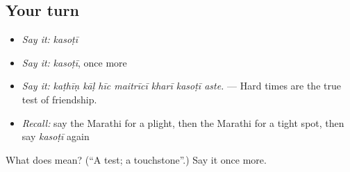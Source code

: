 \subsection*{Your turn}
\begin{itemize}
\raggedright
  \item \emph{Say it:} \emph{kasoṭī}
  \item \emph{Say it:} \emph{kasoṭī}, once more
  \item \emph{Say it:} \emph{kaṭhīṇ kāḷ hīc maitrīcī kharī kasoṭī aste.} — Hard times are the true test of friendship.
  \item \emph{Recall:} say the Marathi for a plight, then the Marathi for a tight spot, then say \emph{kasoṭī} again
\end{itemize}

\begin{tcolorbox}[breakable,colback=teal!4,colframe=teal!35!black,title={Before you move on}]
What does  mean? (\textquotedblleft{}A test; a touchstone\textquotedblright{}.) Say it once more.
\end{tcolorbox}
